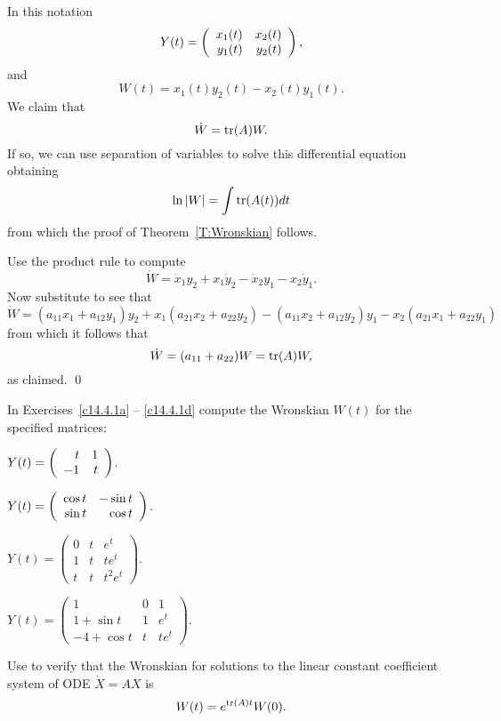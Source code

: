 \documentclass{ximera}
\begin{document}
In this notation 
\[
Y(t) = \left(\begin{array}{rr} x_1(t) & x_2(t)\\ y_1(t) &y_2(t)\end{array}\right),
\]
and
\[
W(t) = x_1(t)y_2(t) - x_2(t)y_1(t).
\]
We claim that 
\[
\dot{W} = {\rm tr}(A) W.
\]
If so, we can use separation of variables to solve this differential equation 
obtaining
\[
\ln |W| = \int {\rm tr}(A(t))dt 
\]
from which the proof of Theorem~\ref{T:Wronskian} follows.

Use the product rule to compute
\[
\dot{W}  =  \dot{x}_1y_2 + x_1\dot{y}_2 - \dot{x}_2y_1 - x_2\dot{y}_1.
\]
Now substitute  to see that 
\[
\dot{W} = (a_{11}x_1 + a_{12}y_1)y_2 + x_1(a_{21}x_2 + a_{22}y_2)
- (a_{11}x_2 + a_{12}y_2)y_1 - x_2(a_{21}x_1 + a_{22}y_1)
\]
from which it follows that 
\[
\dot{W} = (a_{11}+a_{22})W = {\rm tr}(A)W,
\]
as claimed.
\qed


\EXER

\TEXER

In Exercises~\ref{c14.4.1a} -- \ref{c14.4.1d} compute the Wronskian
$W(t)$ for the specified matrices:

\begin{exercise} \label{c14.4.1a}
$Y(t) = \left(\begin{array}{rr} t & 1\\ -1 &t\end{array}\right)$.
\end{exercise}

\begin{exercise} \label{c14.4.1b}
$Y(t) = \left(\begin{array}{rr} \cos t & -\sin t\\ \sin t &\cos t\end{array}\right)$.
\end{exercise}

\begin{exercise} \label{c14.4.1c}
$Y(t) = \left(\begin{array}{ccc}
0 & t & e^t\\  1 & t & te^t \\ t & t & t^2 e^t \end{array}\right)$.
\end{exercise}

\begin{exercise} \label{c14.4.1d}
$Y(t) = \left(\begin{array}{ccc}
1 & 0 & 1\\  1 + \sin t & 1 & e^t \\ -4 + \cos t & t & te^t 
\end{array}\right)$.
\end{exercise}

\begin{exercise}  \label{c14.w.2}
Use  to verify that the Wronskian for solutions to the linear 
constant coefficient system of ODE $\dot{X}=AX$ is
\begin{equation}  \label{E:ccw}
W(t) = e^{{\rm tr}(A)t}W(0).
\end{equation}
\end{exercise}
\end{document}
